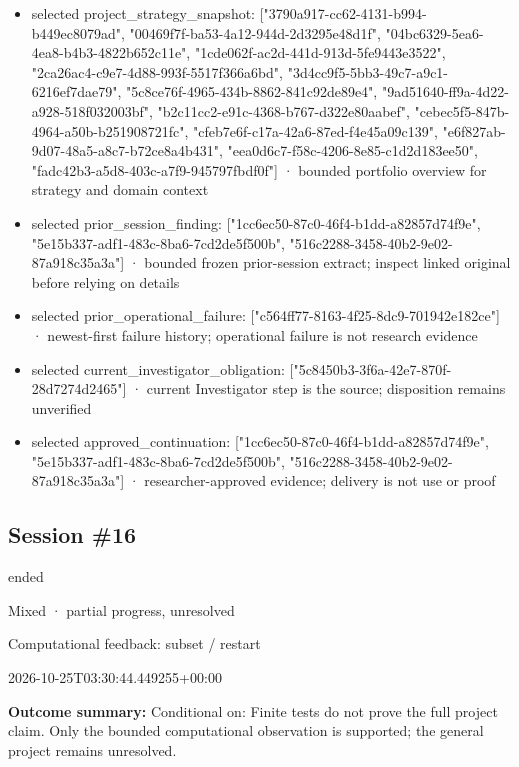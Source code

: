 \documentclass[11pt]{article}
\begin{document}
\begin{itemize}
\item selected project\_strategy\_snapshot: ["3790a917-cc62-4131-b994-b449ec8079ad", "00469f7f-ba53-4a12-944d-2d3295e48d1f", "04bc6329-5ea6-4ea8-b4b3-4822b652c11e", "1cde062f-ac2d-441d-913d-5fe9443e3522", "2ca26ac4-c9e7-4d88-993f-5517f366a6bd", "3d4cc9f5-5bb3-49c7-a9c1-6216ef7dae79", "5c8ce76f-4965-434b-8862-841c92de89e4", "9ad51640-ff9a-4d22-a928-518f032003bf", "b2c11cc2-e91c-4368-b767-d322e80aabef", "cebec5f5-847b-4964-a50b-b251908721fc", "cfeb7e6f-c17a-42a6-87ed-f4e45a09c139", "e6f827ab-9d07-48a5-a8c7-b72ce8a4b431", "eea0d6c7-f58c-4206-8e85-c1d2d183ee50", "fadc42b3-a5d8-403c-a7f9-945797fbdf0f"] · bounded portfolio overview for strategy and domain context
\item selected prior\_session\_finding: ["1cc6ec50-87c0-46f4-b1dd-a82857d74f9e", "5e15b337-adf1-483c-8ba6-7cd2de5f500b", "516c2288-3458-40b2-9e02-87a918c35a3a"] · bounded frozen prior-session extract; inspect linked original before relying on details
\item selected prior\_operational\_failure: ["c564ff77-8163-4f25-8dc9-701942e182ce"] · newest-first failure history; operational failure is not research evidence
\item selected current\_investigator\_obligation: ["5c8450b3-3f6a-42e7-870f-28d7274d2465"] · current Investigator step is the source; disposition remains unverified
\item selected approved\_continuation: ["1cc6ec50-87c0-46f4-b1dd-a82857d74f9e", "5e15b337-adf1-483c-8ba6-7cd2de5f500b", "516c2288-3458-40b2-9e02-87a918c35a3a"] · researcher-approved evidence; delivery is not use or proof
\end{itemize}
\subsection{Session \#16}
\begin{description}[style=nextline,font=\normalfont\bfseries,leftmargin=0pt,labelsep=0pt]
\item[Execution status] ended
\item[Outcome] Mixed · partial progress, unresolved
\item[Strategy] Computational feedback: subset / restart
\item[Started] 2026-10-25T03:30:44.449255+00:00
\end{description}
\textbf{Outcome summary:} Conditional on: Finite tests do not prove the full project claim. Only the bounded computational observation is supported; the general project remains unresolved.\par
\end{document}
